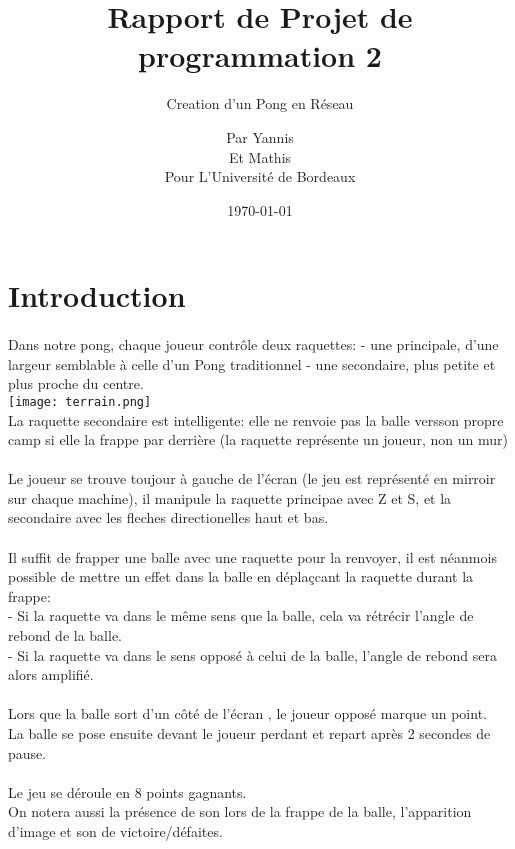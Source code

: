 \documentclass[a4paper, 12pt]{scrreprt}
\title{Rapport de Projet de programmation 2}
\subtitle{Creation d'un Pong en Réseau}
\author{Par \bsc{Bendi-Ouis} Yannis \\
Et \bsc{Rade-Morzadec} Mathis \\
Pour L'Université de Bordeaux}
\date{\today}
\begin{document}
\maketitle

\section*{Introduction}
\paragraph{}
Dans notre pong, chaque joueur contrôle deux raquettes:
- une principale, d'une largeur semblable à celle d'un Pong traditionnel
- une secondaire, plus petite et plus proche du centre.
\\\texttt{[image: terrain.png]}
\\La raquette secondaire est intelligente: elle ne renvoie pas la balle versson propre camp si elle la frappe par derrière (la raquette représente un joueur, non un mur)
\paragraph{}
Le joueur se trouve toujour à gauche de l'écran (le jeu est représenté en mirroir sur chaque machine), il manipule la raquette principae avec Z et S, et la secondaire avec les fleches directionelles haut et bas.
\paragraph{}
Il suffit de frapper une balle avec une raquette pour la renvoyer, il est néanmois possible de mettre un effet dans la balle en déplaçcant la raquette durant la frappe:
\\- Si la raquette va dans le même sens que la balle, cela va rétrécir l'angle de rebond de la balle.
\\- Si la raquette va dans le sens opposé à celui de la balle, l'angle de rebond sera alors amplifié.

\paragraph{}
Lors que la balle sort d'un côté de l'écran , le joueur opposé marque un point.
\\La balle se pose ensuite devant le joueur perdant et repart après 2 secondes de pause.
\paragraph{}
Le jeu se déroule en 8 points gagnants.
\\On notera aussi la présence de son lors de la frappe de la balle, l'apparition d'image et son de victoire/défaites.
\end{document}
